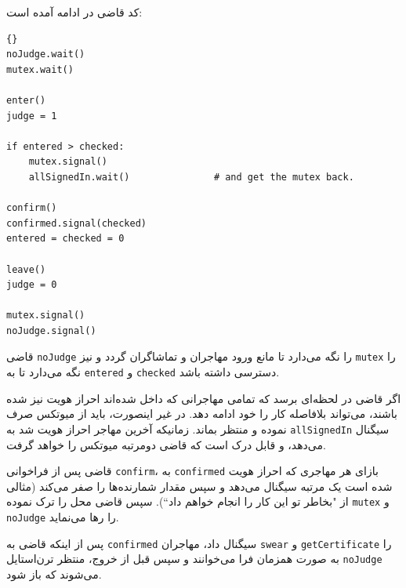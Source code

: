 \documentclass{book}
\begin{document}
    کد قاضی در ادامه آمده است: 

\begin{latin}
\begin{lstlisting}[title=\rl{راهنمایی مسأله تالار \lr{Faneuil} (فاضی)}]{}
noJudge.wait()
mutex.wait()

enter()
judge = 1

if entered > checked:
    mutex.signal()
    allSignedIn.wait()               # and get the mutex back.

confirm()
confirmed.signal(checked)
entered = checked = 0

leave()
judge = 0

mutex.signal()
noJudge.signal()
\end{lstlisting}
\end{latin}

    قاضی {\tt noJudge} را نگه می‌دارد تا مانع ورود مهاجران و تماشاگران گردد و نیز {\tt mutex} را نگه می‌دارد تا به {\tt entered} و  {\tt checked}
    دسترسی داشته باشد. 

    اگر قاضی در لحظه‌ای برسد که تمامی مهاجرانی که داخل شده‌اند احراز هویت نیز شده باشند، می‌تواند بلافاصله کار را  خود ادامه دهد. 
    در غیر اینصورت، باید از میوتکس صرف نموده و منتظر بماند. زمانیکه آخرین مهاجر احراز هویت شد به  {\tt allSignedIn} سیگنال می‌دهد، 
    و قابل درک است که قاضی دومرتبه میوتکس را خواهد گرفت. 
    

    قاضی پس از فراخوانی {\tt confirm}، به  {\tt confirmed} بازای هر مهاجری که احراز هویت شده است  یک مرتبه سیگنال می‌دهد و سپس 
    مقدار شمارنده‌ها را صفر می‌کند (مثالی از "بخاطر تو این کار را انجام خواهم داد``).
    سپس قاضی محل را ترک نموده {\tt mutex} و {\tt noJudge}  را رها می‌نماید. 

    پس از اینکه قاضی به {\tt confirmed} سیگنال داد، مهاجران {\tt swear} و {\tt getCertificate} را به صورت همزمان فرا می‌خوانند و سپس 
    قبل از خروج، منتظر ترن‌استایل {\tt noJudge} می‌شوند که باز شود. 
\end{document}

